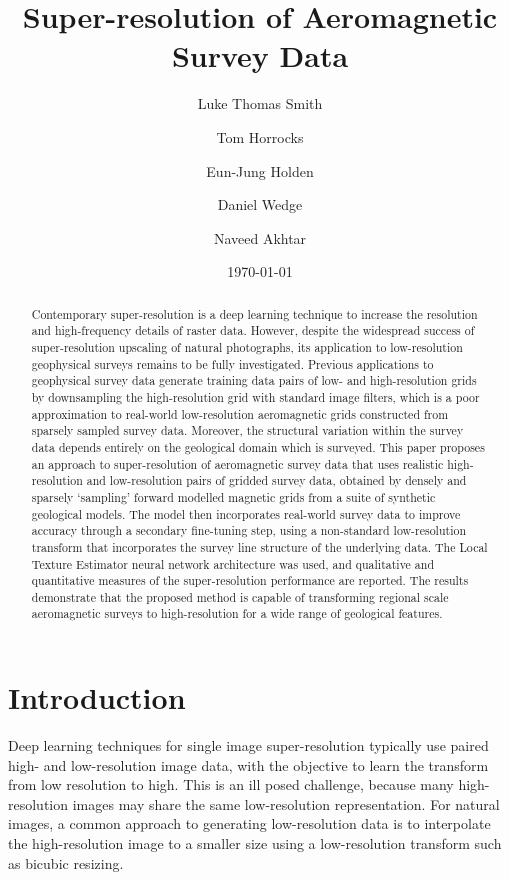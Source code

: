 \documentclass[manuscript.tex]{subfiles}
\begin{document}
\setcounter{chapter}{1}
\title{Super-resolution of Aeromagnetic Survey Data}
\author[1*]{Luke Thomas Smith}
\author[1]{Tom Horrocks}
\author[1]{Eun-Jung Holden}
\author[1]{Daniel Wedge}
\author[2]{Naveed Akhtar}
\date{\today}
\maketitle{}

\begin{abstract}
    Contemporary super-resolution is a deep learning technique to increase the resolution and high-frequency details of raster data.
    However, despite the widespread success of super-resolution upscaling of natural photographs, its application to low-resolution geophysical surveys remains to be fully investigated.
    Previous applications to geophysical survey data generate training data pairs of low- and high-resolution grids by downsampling the high-resolution grid with standard image filters, which is a poor approximation to real-world low-resolution aeromagnetic grids constructed from sparsely sampled survey data.
    Moreover, the structural variation within the survey data depends entirely on the geological domain which is surveyed.
    This paper proposes an approach to super-resolution of aeromagnetic survey data that uses realistic high-resolution and low-resolution pairs of gridded survey data, obtained by densely and sparsely `sampling' forward modelled magnetic grids from a suite of synthetic geological models.
    The model then incorporates real-world survey data to improve accuracy through a secondary fine-tuning step, using a non-standard low-resolution transform that incorporates the survey line structure of the underlying data.
    The Local Texture Estimator neural network architecture was used, and qualitative and quantitative measures of the super-resolution performance are reported.
    The results demonstrate that the proposed method is capable of transforming regional scale aeromagnetic surveys to high-resolution for a wide range of geological features.
\end{abstract}

\section{Introduction}
Deep learning techniques for single image super-resolution typically use paired high- and low-resolution image data, with the objective to learn the transform from low resolution to high.
This is an ill posed challenge, because many high-resolution images may share the same low-resolution representation.
For natural images, a common approach to generating low-resolution data is to interpolate the high-resolution image to a smaller size using a low-resolution transform such as bicubic resizing.
\end{document}
